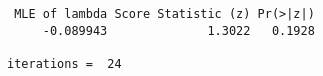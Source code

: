 \begin{verbatim} MLE of lambda Score Statistic (z) Pr(>|z|)
     -0.089943              1.3022   0.1928

iterations =  24 
\end{verbatim}
